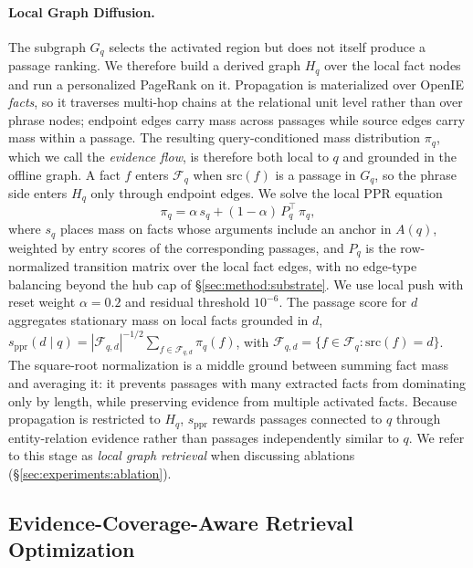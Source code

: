 \paragraph{Local Graph Diffusion.}
The subgraph $G_q$ selects the activated region but does not itself
produce a passage ranking. We therefore build a derived graph
$H_q$ over the local fact nodes and run a personalized PageRank on
it. Propagation is materialized over OpenIE \emph{facts}, so it
traverses multi-hop chains at the relational unit level rather
than over phrase nodes; endpoint edges carry mass across passages
while source edges carry mass within a passage. The resulting
query-conditioned mass distribution $\pi_q$, which we call the
\emph{evidence flow}, is therefore both local to $q$ and grounded
in the offline graph. A fact $f$ enters $\mathcal{F}_q$ when
$\mathrm{src}(f)$ is a passage in $G_q$, so the phrase side enters
$H_q$ only through endpoint edges. We solve the local PPR equation
\begin{equation}
\label{eq:local-ppr}
\pi_q = \alpha\, s_q + (1-\alpha)\, P_q^{\!\top}\, \pi_q,
\end{equation}
where $s_q$ places mass on facts whose arguments include an anchor
in $A(q)$, weighted by entry scores of the corresponding passages,
and $P_q$ is the row-normalized transition matrix over the local
fact edges, with no edge-type balancing beyond the hub cap of
\S\ref{sec:method:substrate}. We use local push with reset weight
$\alpha=0.2$ and residual threshold $10^{-6}$. The passage score
for $d$ aggregates stationary mass on local facts grounded in $d$,
$s_{\mathrm{ppr}}(d \mid q) = |\mathcal{F}_{q,d}|^{-1/2}
\sum_{f\in\mathcal{F}_{q,d}}\pi_q(f)$, with
$\mathcal{F}_{q,d}=\{f\in\mathcal{F}_q:\mathrm{src}(f)=d\}$. The
square-root normalization is a middle ground between summing fact
mass and averaging it: it prevents passages with many extracted
facts from dominating only by length, while preserving evidence
from multiple activated facts. Because propagation is restricted
to $H_q$, $s_{\mathrm{ppr}}$ rewards passages connected to $q$
through entity-relation evidence rather than passages independently
similar to $q$. We refer to this stage as \emph{local graph
retrieval} when discussing ablations
(\S\ref{sec:experiments:ablation}).

\subsection{Evidence-Coverage-Aware Retrieval Optimization}
\label{sec:method:enhancement}

